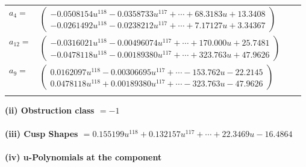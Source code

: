 \documentclass[1p]{elsarticle_modified}
\theoremstyle{definition}
\begin{document}
\begin{tabular}{m{7pt} m{180pt} m{7pt} m{180pt} }
\flushright $a_{4}=$&$\begin{pmatrix}-0.0508154 u^{118}-0.0358733 u^{117}+\cdots+68.3183 u+13.3408\\-0.0261492 u^{118}-0.0238212 u^{117}+\cdots+7.17127 u+3.34367\end{pmatrix}$ \\
\flushright $a_{12}=$&$\begin{pmatrix}-0.0316021 u^{118}-0.00496074 u^{117}+\cdots+170.000 u+25.7481\\-0.0478118 u^{118}-0.00189380 u^{117}+\cdots+323.763 u+47.9626\end{pmatrix}$ \\
\flushright $a_{9}=$&$\begin{pmatrix}0.0162097 u^{118}-0.00306695 u^{117}+\cdots-153.762 u-22.2145\\0.0478118 u^{118}+0.00189380 u^{117}+\cdots-323.763 u-47.9626\end{pmatrix}$\\&\end{tabular}
\flushleft \textbf{(ii) Obstruction class $= -1$}\\~\\
\flushleft \textbf{(iii) Cusp Shapes $= 0.155199 u^{118}+0.132157 u^{117}+\cdots+22.3469 u-16.4864$}\\~\\
\newpage\renewcommand{\arraystretch}{1}
\flushleft \textbf{(iv) u-Polynomials at the component}\newline \\
\end{document}
